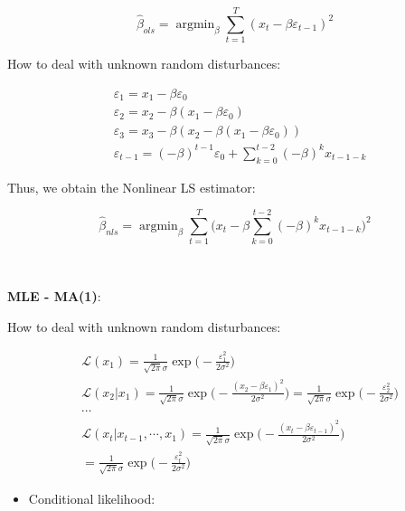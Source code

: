\documentclass[
]{book}
\providecommand{\tightlist}{%
  \setlength{\itemsep}{0pt}\setlength{\parskip}{0pt}}
\begin{document}
\[\begin{equation*}
        \hat{\beta}_{ols}=\mathop{\mathrm{argmin}}_\beta{\sum_{t=1}^T{(x_t-\beta\varepsilon_{t-1})^2}}
    \end{equation*}\]

How to deal with unknown random disturbances:

\begin{align*}
        &\varepsilon_1=x_1-\beta\varepsilon_0 \\
        &\varepsilon_2=x_2-\beta(x_1-\beta\varepsilon_0) \\
        &\varepsilon_3=x_3-\beta(x_2-\beta(x_1-\beta\varepsilon_0)) \\
        
&\varepsilon_{t-1}=(-\beta)^{t-1}\varepsilon_0+\sum_{k=0}^{t-2}{(-\beta)^kx_{t-1-k}}\end{align*}

Thus, we obtain the Nonlinear LS estimator:

\[\begin{equation*}
        \hat{\beta}_{nls}=\mathop{\mathrm{argmin}}_{\beta}{\sum_{t=1}^{T}{\bigg(x_t-\beta\sum_{k=0}^{t-2}{(-\beta)^kx_{t-1-k}}\bigg)^2}}
    \end{equation*}\]

~

\textbf{MLE - MA(1)}:

How to deal with unknown random disturbances:

\begin{align*}
        &\mathcal{L}(x_1)=\frac{1}{\sqrt{2\pi}\sigma}\exp{\bigg(-\frac{\varepsilon_1^2}{2\sigma^2}\bigg)} \\
        &\mathcal{L}(x_2|x_1)=\frac{1}{\sqrt{2\pi}\sigma}\exp{\bigg(-\frac{(x_2-\beta\varepsilon_1)^2}{2\sigma^2}\bigg)}=\frac{1}{\sqrt{2\pi}\sigma}\exp{\bigg(-\frac{\varepsilon_2^2}{2\sigma^2}\bigg)} \\
        &\cdots \\
        &\mathcal{L}(x_t|x_{t-1},\cdots,x_1)=\frac{1}{\sqrt{2\pi}\sigma}\exp{\bigg(-\frac{(x_t-\beta\varepsilon_{t-1})^2}{2\sigma^2}\bigg)}\\
        &=\frac{1}{\sqrt{2\pi}\sigma}\exp{\bigg(-\frac{\varepsilon_t^2}{2\sigma^2}\bigg)}
    \end{align*}

\begin{itemize}
\tightlist
\item
  Conditional likelihood:
\end{itemize}
\end{document}
